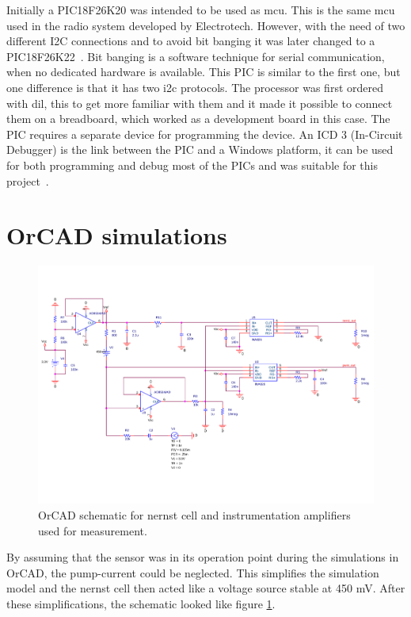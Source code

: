 Initially a PIC18F26K20 was intended to be used as \ac{mcu}. This is the same \ac{mcu} used in the radio system developed by Electrotech. However, with the need of two different I2C connections and to avoid bit banging it was later changed to a PIC18F26K22~\cite{PIC18}. Bit banging is a software technique for serial communication, when no dedicated hardware is available. This PIC is similar to the first one, but one difference is that it has two \ac{i2c} protocols. The processor was first ordered with \ac{dil}, this to get more familiar with them and it made it possible to connect them on a breadboard, which worked as a development board in this case. The PIC requires a separate device for programming the device. An ICD 3 (In-Circuit Debugger) is the link between the PIC and a Windows platform, it can be used for both programming and debug most of the PICs and was suitable for this project~\cite{ICD3}.





\section{OrCAD simulations}

\begin{figure}
    \centering
    \includegraphics[width = \textwidth]{Figures/SCHEMATIC1_orcad.pdf}
    \caption{OrCAD schematic for nernst cell and instrumentation amplifiers used for measurement.}
    \label{fig:schematic1_orcad}
\end{figure}


By assuming that the sensor was in its operation point during the simulations in OrCAD, the pump-current could be neglected. This simplifies the simulation model and the nernst cell then acted like a voltage source stable at 450 mV. After these simplifications, the schematic looked like figure \ref{fig:schematic1_orcad}.



